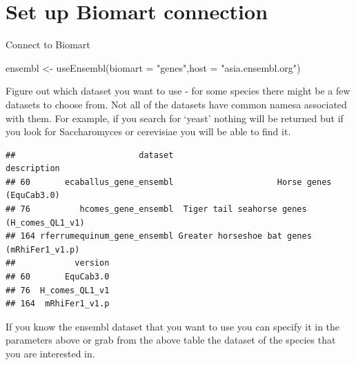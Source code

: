 \documentclass[
]{book}
\newenvironment{Shaded}{\begin{snugshade}}{\end{snugshade}}
\newcommand{\AttributeTok}[1]{\textcolor[rgb]{0.77,0.63,0.00}{#1}}
\newcommand{\CommentTok}[1]{\textcolor[rgb]{0.56,0.35,0.01}{\textit{#1}}}
\newcommand{\ConstantTok}[1]{\textcolor[rgb]{0.00,0.00,0.00}{#1}}
\newcommand{\FunctionTok}[1]{\textcolor[rgb]{0.00,0.00,0.00}{#1}}
\newcommand{\NormalTok}[1]{#1}
\newcommand{\OtherTok}[1]{\textcolor[rgb]{0.56,0.35,0.01}{#1}}
\newcommand{\SpecialCharTok}[1]{\textcolor[rgb]{0.00,0.00,0.00}{#1}}
\newcommand{\StringTok}[1]{\textcolor[rgb]{0.31,0.60,0.02}{#1}}
\begin{document}
\hypertarget{set-up-biomart-connection}{%
\section{Set up Biomart connection}\label{set-up-biomart-connection}}

Connect to Biomart

\begin{Shaded}
\begin{Highlighting}[]
\NormalTok{ensembl }\OtherTok{\textless{}{-}} \FunctionTok{useEnsembl}\NormalTok{(}\AttributeTok{biomart =} \StringTok{"genes"}\NormalTok{,}\AttributeTok{host =} \StringTok{"asia.ensembl.org"}\NormalTok{)}
\end{Highlighting}
\end{Shaded}

Figure out which dataset you want to use - for some species there might be a few datasets to choose from. Not all of the datasets have common namesa associated with them. For example, if you search for `yeast' nothing will be returned but if you look for Saccharomyces or cerevisiae you will be able to find it.

\begin{Shaded}
\end{Shaded}

\begin{verbatim}
##                         dataset                                 description
## 60       ecaballus_gene_ensembl                     Horse genes (EquCab3.0)
## 76          hcomes_gene_ensembl  Tiger tail seahorse genes (H_comes_QL1_v1)
## 164 rferrumequinum_gene_ensembl Greater horseshoe bat genes (mRhiFer1_v1.p)
##            version
## 60       EquCab3.0
## 76  H_comes_QL1_v1
## 164  mRhiFer1_v1.p
\end{verbatim}

If you know the ensembl dataset that you want to use you can specify it in the parameters above or grab from the above table the dataset of the species that you are interested in.
\end{document}
